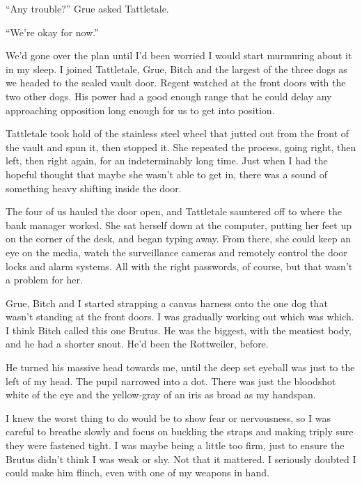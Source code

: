 





``Any trouble?'' Grue asked Tattletale.



``We're okay for now.''



We'd gone over the plan until I'd been worried I would start murmuring about it in my sleep. I joined Tattletale, Grue, Bitch and the largest of the three dogs as we headed to the sealed vault door.  Regent watched at the front doors with the two other dogs.  His power had a good enough range that he could delay any approaching opposition long enough for us to get into position.



Tattletale took hold of the stainless steel wheel that jutted out from the front of the vault and spun it, then stopped it. She repeated the process, going right, then left, then right again, for an indeterminably long time.  Just when I had the hopeful thought that maybe she wasn't able to get in, there was a sound of something heavy shifting inside the door.



The four of us hauled the door open, and Tattletale sauntered off to where the bank manager worked. She sat herself down at the computer, putting her feet up on the corner of the desk, and began typing away.  From there, she could keep an eye on the media, watch the surveillance cameras and remotely control the door locks and alarm systems.  All with the right passwords, of course, but that wasn't a problem for her.



Grue, Bitch and I started strapping a canvas harness onto the one dog that wasn't standing at the front doors. I was gradually working out which was which.  I think Bitch called this one Brutus.  He was the biggest, with the meatiest body, and he had a shorter snout.  He'd been the Rottweiler, before.



He turned his massive head towards me, until the deep set eyeball was just to the left of my head.  The pupil narrowed into a dot.  There was just the bloodshot white of the eye and the yellow-gray of an iris as broad as my handspan.



I knew the worst thing to do would be to show fear or nervousness, so I was careful to breathe slowly and focus on buckling the straps and making triply sure they were fastened tight.  I was maybe being a little too firm, just to ensure the Brutus didn't think I was weak or shy.  Not that it mattered.  I seriously doubted I could make him flinch, even with one of my weapons in hand.



